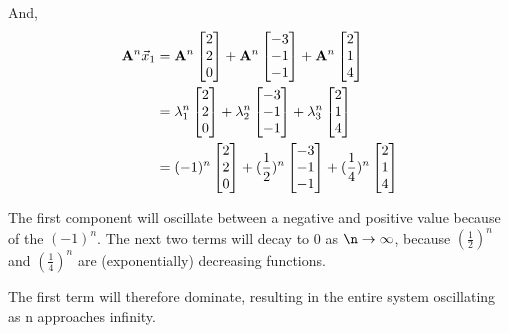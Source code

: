 \begin{enumerate}
{    And, 
    \begin{align*}
    \mathbf{A}^n\vec{x}_1 &= \mathbf{A}^n \begin{bmatrix}2 \\ 2 \\ 0\end{bmatrix} + \mathbf{A}^n \begin{bmatrix}-3 \\ -1 \\ -1\end{bmatrix} + \mathbf{A}^n \begin{bmatrix}2 \\ 1 \\ 4\end{bmatrix} \\
    &= \lambda_1^n \begin{bmatrix}2 \\ 2 \\ 0\end{bmatrix} + \lambda_2^n \begin{bmatrix}-3 \\ -1 \\ -1\end{bmatrix} + \lambda_3^n \begin{bmatrix}2 \\ 1 \\ 4\end{bmatrix} \\
    &= (-1)^n \begin{bmatrix}2 \\ 2 \\ 0\end{bmatrix} + (\frac{1}{2})^n \begin{bmatrix}-3 \\ -1 \\ -1\end{bmatrix} + (\frac{1}{4})^n \begin{bmatrix}2 \\ 1 \\ 4\end{bmatrix} \\
    \end{align*}
    
    The first component will oscillate between a negative and positive value because of the $(-1)^n$. The next two terms will decay to 0 as $\n\to\infty$, because $(\frac{1}{2})^n$ and $(\frac{1}{4})^n$ are (exponentially) decreasing functions.
    
    The first term will therefore dominate, resulting in the entire system oscillating as n approaches infinity.
    
}
\end{enumerate}
